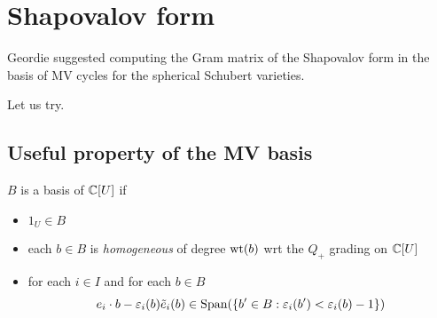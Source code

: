
\section*{Shapovalov form}

Geordie suggested computing the Gram matrix of the Shapovalov form in the basis of MV cycles for the spherical Schubert varieties. 

Let us try.

\subsection*{Useful property of the MV basis}

\begin{definition}
    $B$ is a  basis of $\mathbb C[U]$ if 
    \begin{itemize}
        \item $1_U\in B$
        \item each $b\in B$ is \textit{homogeneous} of degree $\operatorname{wt}(b)$ wrt the $Q_+$ grading on $\mathbb C[U]$
        \item for each $i\in I$ and for each $b\in B$
        \begin{equation}
            e_i \cdot b - \varepsilon_i(b) \tilde e_i (b) \in \operatorname{Span}(\{b'\in B : \varepsilon_i(b') < \varepsilon_i(b) - 1\})
        \end{equation}
    \end{itemize}
\end{definition}

